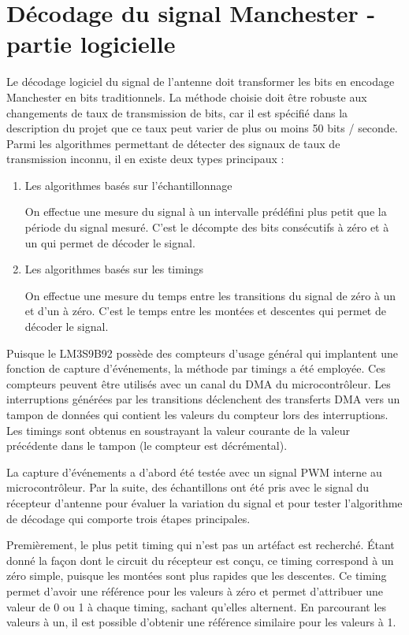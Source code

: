 \section{Décodage du signal Manchester - partie logicielle}

Le décodage logiciel du signal de l'antenne doit transformer les bits en encodage Manchester en bits traditionnels. La méthode choisie doit être robuste aux changements de taux de transmission de bits, car il est spécifié dans la description du projet que ce taux peut varier de plus ou moins 50 bits / seconde. Parmi les algorithmes permettant de détecter des signaux de taux de transmission inconnu, il en existe deux types principaux : 

\begin{enumerate}
\item{Les algorithmes basés sur l'échantillonnage}

On effectue une mesure du signal à un intervalle prédéfini plus petit que la période du signal mesuré. C'est le décompte des bits consécutifs à zéro et à un qui permet de décoder le signal.

\item{Les algorithmes basés sur les timings} 

On effectue une mesure du temps entre les transitions du signal de zéro à un et d'un à zéro. C'est le temps entre les montées et descentes qui permet de décoder le signal.
\end{enumerate}

Puisque le LM3S9B92 possède des compteurs d'usage général qui implantent une fonction de capture d'événements, la méthode par timings a été employée. Ces compteurs peuvent être utilisés avec un canal du DMA du microcontrôleur. Les interruptions générées par les transitions déclenchent des transferts DMA vers un tampon de données qui contient les valeurs du compteur lors des interruptions. Les timings sont obtenus en soustrayant la valeur courante de la valeur précédente dans le tampon (le compteur est décrémental). 

La capture d'événements a d'abord été testée avec un signal PWM interne au microcontrôleur. Par la suite, des échantillons ont été pris avec le signal du récepteur d'antenne pour évaluer la variation du signal et pour tester l'algorithme de décodage qui comporte trois étapes principales. 

Premièrement, le plus petit timing qui n'est pas un artéfact est recherché. Étant donné la façon dont le circuit du récepteur est conçu, ce timing correspond à un zéro simple, puisque les montées sont plus rapides que les descentes. Ce timing permet d'avoir une référence pour les valeurs à zéro et permet d'attribuer une valeur de 0 ou 1 à chaque timing, sachant qu'elles alternent. En parcourant les valeurs à un, il est possible d'obtenir une référence similaire pour les valeurs à 1.

